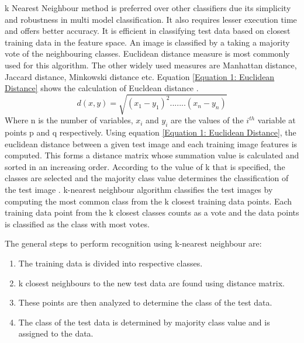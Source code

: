 \documentclass[conference]{IEEEtran}
\begin{document}
k Nearest Neighbour method is preferred over other classifiers due its simplicity and robustness in multi model classification. It also requires lesser execution time and offers better accuracy. It is efficient in classifying test data based on closest training data in the feature space. An image is classified by a taking a majority vote of the neighbouring classes. Euclidean distance measure is most commonly used for this algorithm. The other widely used measures are Manhattan distance, Jaccard distance, Minkowski distance etc. Equation \ref{Equation 1: Euclidean Distance} shows the calculation of Eucldean distance \cite{weinberger2006distance}. 
\begin{equation}
\label{Equation 1: Euclidean Distance}
d(x,y) = \sqrt{(x_1-y_1)^2.......(x_n-y_n)}
\end{equation}
Where n is the number of variables, $x_i$ and $y_i$ are the values of the $i^{th}$ variable at points p and q respectively. Using equation \ref{Equation 1: Euclidean Distance}, the euclidean distance between a given test image and each training image features is computed. This forms a distance matrix whose summation value is calculated and sorted in an increasing order. According to the value of k that is specified, the classes are selected and the majority class value determines the classification of the test image \cite{kaur2012k}. k-nearest neighbour algorithm classifies the test images by computing the most common class from the k closest training data points. Each training data point from the k closest classes counts as a vote and the data points is classified as the class with most votes.

The general steps to perform recognition using k-nearest neighbour are:
\begin{enumerate}
\item The training data is divided into respective classes.
\item k closest neighbours to the new test data are found using distance matrix.
\item These points are then analyzed to determine the class of the test data.
\item The class of the test data is determined by majority class value and is assigned to the data.
\end{enumerate}
\end{document}
